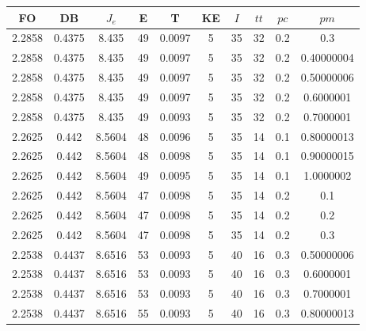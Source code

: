 \begin{table}[h!]
    \footnotesize
    \begin{center}
        \begin{tabular}{|c|c|c|c|c|c|c|c|c|c|}
        \hline
            {\bf FO} & {\bf DB} & $J_e$ & {\bf E} & {\bf T} & {\bf KE} & $I$ & $tt$ & $pc$ & $pm$ \\
        \hline
        \hline
            2.2858 & 0.4375  & 8.435 & 49 & 0.0097 & 5 & 35 & 32 & 0.2 & 0.3\\
        \hline
        \hline
            2.2858 & 0.4375  & 8.435 & 49 & 0.0097 & 5 & 35 & 32 & 0.2 & 0.40000004\\
        \hline
        \hline
            2.2858 & 0.4375  & 8.435 & 49 & 0.0097 & 5 & 35 & 32 & 0.2 & 0.50000006\\
        \hline
        \hline
            2.2858 & 0.4375  & 8.435 & 49 & 0.0097 & 5 & 35 & 32 & 0.2 & 0.6000001\\
        \hline
        \hline
            2.2858 & 0.4375  & 8.435 & 49 & 0.0093 & 5 & 35 & 32 & 0.2 & 0.7000001\\
        \hline
        \hline
            2.2625 & 0.442  & 8.5604 & 48 & 0.0096 & 5 & 35 & 14 & 0.1 & 0.80000013\\
        \hline
        \hline
            2.2625 & 0.442  & 8.5604 & 48 & 0.0098 & 5 & 35 & 14 & 0.1 & 0.90000015\\
        \hline
        \hline
            2.2625 & 0.442  & 8.5604 & 49 & 0.0095 & 5 & 35 & 14 & 0.1 & 1.0000002\\
        \hline
        \hline
            2.2625 & 0.442  & 8.5604 & 47 & 0.0098 & 5 & 35 & 14 & 0.2 & 0.1\\
        \hline
        \hline
            2.2625 & 0.442  & 8.5604 & 47 & 0.0098 & 5 & 35 & 14 & 0.2 & 0.2\\
        \hline
        \hline
            2.2625 & 0.442  & 8.5604 & 47 & 0.0098 & 5 & 35 & 14 & 0.2 & 0.3\\
        \hline
        \hline
            2.2538 & 0.4437  & 8.6516 & 53 & 0.0093 & 5 & 40 & 16 & 0.3 & 0.50000006\\
        \hline
        \hline
            2.2538 & 0.4437  & 8.6516 & 53 & 0.0093 & 5 & 40 & 16 & 0.3 & 0.6000001\\
        \hline
        \hline
            2.2538 & 0.4437  & 8.6516 & 53 & 0.0093 & 5 & 40 & 16 & 0.3 & 0.7000001\\
        \hline
        \hline
            2.2538 & 0.4437  & 8.6516 & 55 & 0.0093 & 5 & 40 & 16 & 0.3 & 0.80000013\\

\end{tabular}
\end{center}
\end{table}
